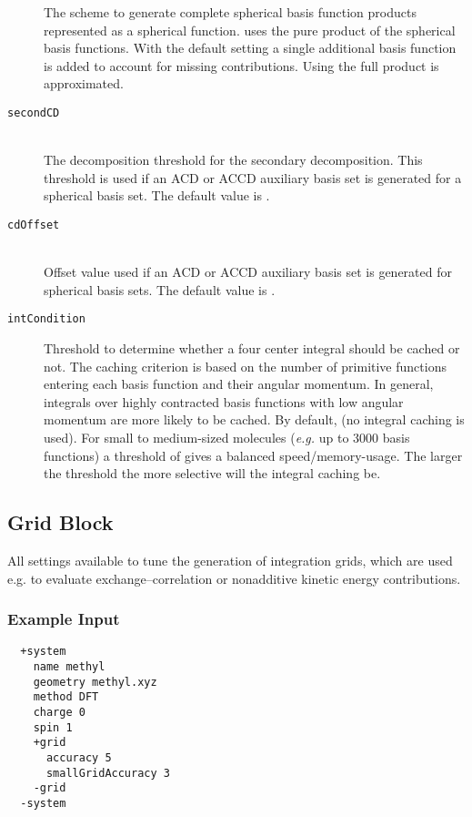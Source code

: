\begin{description}
    The scheme to generate complete spherical basis function products represented as a spherical function.  uses the pure product of the spherical basis functions. With the default setting  a single additional basis function is added to account for missing contributions. Using  the full product is approximated.
    \item [\texttt{secondCD}]\hfill\\
    The decomposition threshold for the secondary decomposition. This threshold is used if an ACD or ACCD auxiliary basis set is generated for a spherical basis set. The default value is .
    \item [\texttt{cdOffset}]\hfill\\
    Offset value used if an ACD or ACCD auxiliary basis set is generated for spherical basis sets. The default value is .
    \item[\texttt{intCondition}]
    Threshold to determine whether a four center integral should be cached or not.
    The caching criterion is based on the number of primitive  functions entering each basis function and their angular
    momentum. In general, integrals over highly contracted basis functions with low angular momentum are more likely to
    be cached. By default,  (no integral caching is used). For small to medium-sized molecules
    (\emph{e.g.} up to 3000 basis functions) a threshold of  gives a balanced speed/memory-usage. The larger the
    threshold the more selective will the integral caching be.
 \end{description}

\subsection{Grid Block}\label{sec:system:grid}
All settings available to tune the generation of integration grids, which are used e.g. to evaluate exchange--correlation or nonadditive kinetic energy contributions.
\subsubsection{Example Input}
\begin{lstlisting}
  +system
    name methyl
    geometry methyl.xyz
    method DFT
    charge 0
    spin 1
    +grid
      accuracy 5
      smallGridAccuracy 3
    -grid
  -system
 \end{lstlisting}
